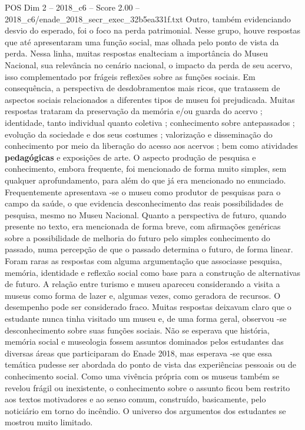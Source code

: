 \begin{textsample}{POS Dim 2 – 2018\_c6 – Score 2.00 – 2018\_c6/enade\_2018\_secr\_exec\_32b5ea331f.txt}
Outro, também evidenciando desvio do esperado, foi o foco na perda patrimonial.
Nesse grupo, houve respostas que até apresentaram uma função social, mas olhada pelo ponto de vista da perda.
Nessa linha, muitas respostas enalteciam a importância do Museu Nacional, sua relevância no cenário nacional, o impacto da perda de seu acervo, isso complementado por frágeis reflexões sobre as funções sociais.
Em consequência, a perspectiva de desdobramentos mais ricos, que tratassem de aspectos sociais relacionados a diferentes tipos de museu foi prejudicada.
Muitas respostas trataram da preservação da memória e/ou guarda do acervo ; identidade, tanto individual quanto coletiva ; conhecimento sobre antepassados ; evolução da sociedade e dos seus costumes ; valorização e disseminação do conhecimento por meio da liberação do acesso aos acervos ; bem como atividades \textbf{pedagógicas} e exposições de arte.
O aspecto produção de pesquisa e conhecimento, embora frequente, foi mencionado de forma muito simples, sem qualquer aprofundamento, para além do que já era mencionado no enunciado.
Frequentemente apresentava -se o museu como produtor de pesquisas para o campo da saúde, o que evidencia desconhecimento das reais possibilidades de pesquisa, mesmo no Museu Nacional.
Quanto a perspectiva de futuro, quando presente no texto, era mencionada de forma breve, com afirmações genéricas sobre a possibilidade de melhoria do futuro pelo simples conhecimento do passado, numa percepção de que o passado determina o futuro, de forma linear.
Foram raras as respostas com alguma argumentação que associasse pesquisa, memória, identidade e reflexão social como base para a construção de alternativas de futuro.
A relação entre turismo e museu apareceu considerando a visita a museus como forma de lazer e, algumas vezes, como geradora de recursos.
O desempenho pode ser considerado fraco.
Muitas respostas deixavam claro que o estudante nunca tinha visitado um museu e, de uma forma geral, observou -se desconhecimento sobre suas funções sociais.
Não se esperava que história, memória social e museologia fossem assuntos dominados pelos estudantes das diversas áreas que participaram do Enade 2018, mas esperava -se que essa temática pudesse ser abordada do ponto de vista das experiências pessoais ou de conhecimento social.
Como uma vivência própria com os museus também se revelou frágil ou inexistente, o conhecimento sobre o assunto ficou bem restrito aos textos motivadores e ao senso comum, construído, basicamente, pelo noticiário em torno do incêndio.
O universo dos argumentos dos estudantes se mostrou muito limitado.

\end{textsample}
